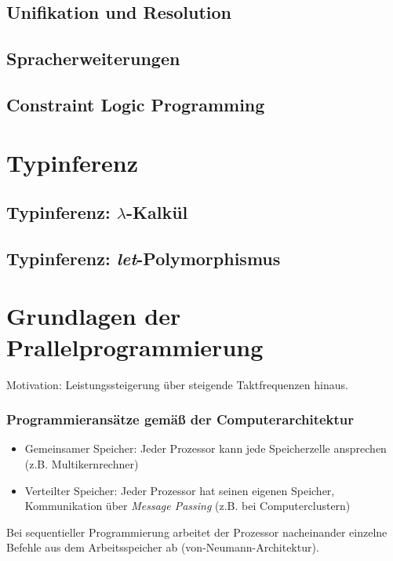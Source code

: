 \subsection{Unifikation und Resolution}


\subsection{Spracherweiterungen}


\subsection{Constraint Logic Programming}



\section{Typinferenz}

\subsection{Typinferenz: $\lambda$-Kalkül}


\subsection{Typinferenz: \textit{let}-Polymorphismus}



\section{Grundlagen der Prallelprogrammierung}
Motivation: Leistungssteigerung über steigende Taktfrequenzen hinaus.

\subsubsection{Programmieransätze gemäß der Computerarchitektur}
\begin{itemize}
	\item Gemeinsamer Speicher: Jeder Prozessor kann jede Speicherzelle ansprechen (z.B. Multikernrechner)
	\item Verteilter Speicher: Jeder Prozessor hat seinen eigenen Speicher, Kommunikation über \textit{Message Passing} (z.B. bei Computerclustern)
\end{itemize}
Bei sequentieller Programmierung arbeitet der Prozessor nacheinander einzelne Befehle aus dem Arbeitsspeicher ab (von-Neumann-Architektur).

